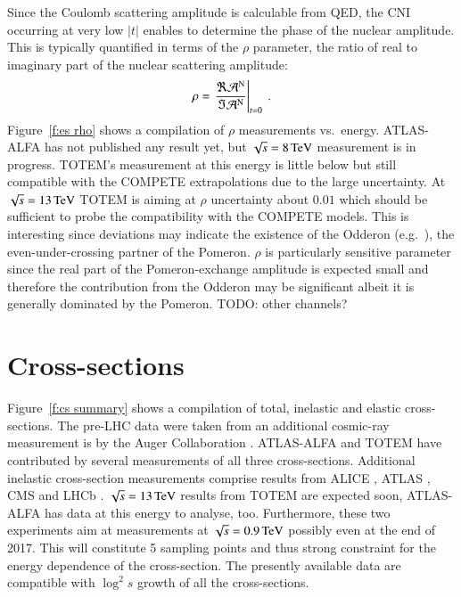 \documentclass{webofc}
\def\un#1{\,{\rm #1}}
\begin{document}
Since the Coulomb scattering amplitude is calculable from QED, the CNI occurring at very low $|t|$ enables to determine the phase of the nuclear amplitude. This is typically quantified in terms of the $\rho$ parameter, the ratio of real to imaginary part of the nuclear scattering amplitude:
\begin{equation}
\rho = \left. {\Re {\cal A}^{\rm N} \over \Im {\cal A}^{\rm N}} \right|_{t = 0}\ .
\end{equation}
Figure~\ref{f:es rho} shows a compilation of $\rho$ measurements vs.~energy. ATLAS-ALFA has not published any result yet, but $\sqrt s = 8\un{TeV}$ measurement is in progress. TOTEM's measurement at this energy \cite{totem-8tev-1km} is little below but still compatible with the COMPETE extrapolations \cite{compete} due to the large uncertainty. At $\sqrt s = 13\un{TeV}$ TOTEM is aiming at $\rho$ uncertainty about $0.01$ which should be sufficient to probe the compatibility with the COMPETE models. This is interesting since deviations may indicate the existence of the Odderon (e.g.~\cite{nicolescu}), the even-under-crossing partner of the Pomeron. $\rho$ is particularly sensitive parameter since the real part of the Pomeron-exchange amplitude is expected small and therefore the contribution from the Odderon may be significant albeit it is generally dominated by the Pomeron. TODO: other channels?


\section{Cross-sections}
\label{s:cs}

Figure~\ref{f:cs summary} shows a compilation of total, inelastic and elastic cross-sections. The pre-LHC data were taken from \cite{pdg} an additional cosmic-ray measurement is by the Auger Collaboration \cite{auger-57tev}. ATLAS-ALFA \cite{alfa-si-el-7tev,alfa-si-el-8tev} and TOTEM \cite{totem-si-tot-7tev,totem-si-8tev,totem-si-2.76tev} have contributed by several measurements of all three cross-sections. Additional inelastic cross-section measurements comprise results from ALICE \cite{alice-inel-sd-dd}, ATLAS \cite{atlas-inel-7tev,atlas-inel-13tev}, CMS \cite{cms-inel-7tev,cms-inel-13tev} and LHCb \cite{lhcb-inel-7tev}. $\sqrt s = 13\un{TeV}$ results from TOTEM are expected soon, ATLAS-ALFA has data at this energy to analyse, too. Furthermore, these two experiments aim at measurements at $\sqrt s = 0.9\un{TeV}$ possibly even at the end of 2017. This will constitute 5 sampling points and thus strong constraint for the energy dependence of the cross-section. The presently available data are compatible with $\log^2 s$ growth of all the cross-sections.
\end{document}
